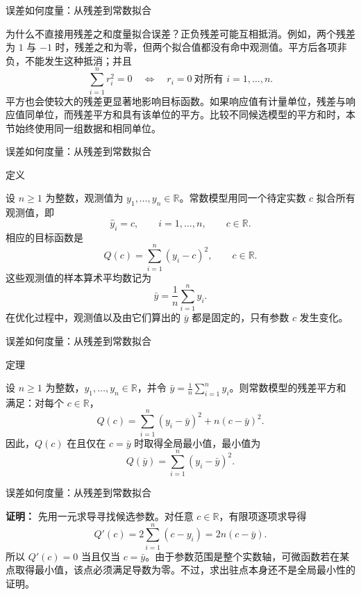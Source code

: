 \documentclass[aspectratio=169,10pt,fontset=fandol]{ctexbeamer}
\begin{document}
\begin{frame}[t,fragile]{误差如何度量：从残差到常数拟合}
\footnotesize
{\footnotesize
为什么不直接用残差之和度量拟合误差？正负残差可能互相抵消。例如，两个残差为 $1$ 与 $-1$ 时，残差之和为零，但两个拟合值都没有命中观测值。平方后各项非负，不能发生这种抵消；并且
\[
\sum_{i=1}^{n}r_i^2=0\quad\Longleftrightarrow\quad r_i=0\ \text{对所有 }i=1,\ldots,n.
\]
平方也会使较大的残差更显著地影响目标函数。如果响应值有计量单位，残差与响应值同单位，而残差平方和具有该单位的平方。比较不同候选模型的平方和时，本节始终使用同一组数据和相同单位。\par

}
\end{frame}
\begin{frame}[t,fragile]{误差如何度量：从残差到常数拟合}
\footnotesize
\begin{block}{定义}
{\footnotesize
设 $n\geq1$ 为整数，观测值为 $y_1,\ldots,y_n\in\mathbb{R}$。常数模型用同一个待定实数 $c$ 拟合所有观测值，即
\[
\hat{y}_i=c,\qquad i=1,\ldots,n,\qquad c\in\mathbb{R}.
\]
相应的目标函数是
\[
Q(c)=\sum_{i=1}^{n}(y_i-c)^2,\qquad c\in\mathbb{R}.
\]
这些观测值的样本算术平均数记为
\[
\bar{y}=\frac{1}{n}\sum_{i=1}^{n}y_i.
\]
在优化过程中，观测值以及由它们算出的 $\bar{y}$ 都是固定的，只有参数 $c$ 发生变化。

}
\end{block}
\end{frame}
\begin{frame}[t,fragile]{误差如何度量：从残差到常数拟合}
\footnotesize
\begin{block}{定理}
{\footnotesize
设 $n\geq1$ 为整数，$y_1,\ldots,y_n\in\mathbb{R}$，并令 $\bar{y}=\frac{1}{n}\sum_{i=1}^{n}y_i$。则常数模型的残差平方和满足：对每个 $c\in\mathbb{R}$，
\[
Q(c)=\sum_{i=1}^{n}(y_i-\bar{y})^2+n(c-\bar{y})^2.
\]
因此，$Q(c)$ 在且仅在 $c=\bar{y}$ 时取得全局最小值，最小值为
\[
Q(\bar{y})=\sum_{i=1}^{n}(y_i-\bar{y})^2.
\]

}
\end{block}
\end{frame}
\begin{frame}[t,fragile]{误差如何度量：从残差到常数拟合}
\footnotesize
{\footnotesize
\textbf{证明：}
先用一元求导寻找候选参数。对任意 $c\in\mathbb{R}$，有限项逐项求导得
\[
Q'(c)=2\sum_{i=1}^{n}(c-y_i)=2n(c-\bar{y}).
\]
所以 $Q'(c)=0$ 当且仅当 $c=\bar{y}$。由于参数范围是整个实数轴，可微函数若在某点取得最小值，该点必须满足导数为零。不过，求出驻点本身还不是全局最小性的证明。


}
\end{frame}
\end{document}
